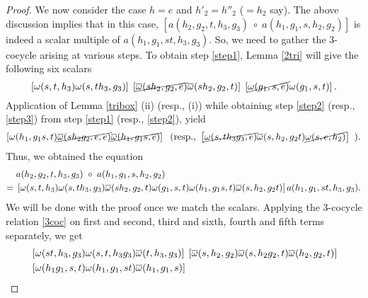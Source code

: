 \begin{proof}
We now consider the case $ h=e $ and $ h'_2 = h''_2$ ($ = h_2$ say).
The above discussion implies that in this case, $ \left[a(h_2 , g_2 , t , h_3 , g_3) \; \circ \; a(h_1 , g_1 , s , h_2 , g_2)\right] $ is indeed a scalar multiple of $ a(h_1 , g_1 , st , h_3 , g_3) $.
So, we need to gather the $ 3 $-cocycle arising at various steps.
To obtain step \ref{step1}, Lemma \ref{2tri} will give the following six scalars
\[
\left[ \omega (s,t,h_3) \omega (s,th_3 , g_3)\right]\;
\left[\cancel{\overline{\omega} (sh_2,g_2,e)} \overline{\omega} (sh_2,g_2,t) \right]\;
\left[ \cancel{\omega (g_1 , s ,e)} \omega (g_1 , s ,t) \right].
\]
Application of Lemma \ref{tribox} (ii) (resp., (i)) while obtaining step \ref{step2} (resp., \ref{step3}) from step \ref{step1} (resp., \ref{step2}), yield
\[
\left[ \omega(h_1 , g_1 s, t) \cancel{\overline{\omega} (sh_2 g_2 ,e ,e)} \cancel{\overline{\omega} (h_1, g_1 s ,e)} \right] \;
\text{ (resp., } \left[ \cancel{\omega (s,th_3g_3,e)} \overline{\omega} (s, h_2, g_2 t) \cancel{\omega (s, e, h_2)} \right]
\text{ ).}
\]
Thus, we obtained the equation
\begin{align*}
& \; a(h_2 , g_2 , t , h_3 , g_3) \; \circ \; a(h_1 , g_1 , s , h_2 , g_2)\\
= & \; \left[ \omega (s,t,h_3) \omega (s,th_3 , g_3) \overline{\omega} (sh_2,g_2,t) \omega (g_1 , s ,t) \omega(h_1 , g_1 s, t)  \overline{\omega} (s, h_2, g_2 t)   \right]
a(h_1 , g_1 , st , h_3 , g_3).
\end{align*}
We will be done with the proof once we match the scalars.
Applying the $ 3 $-cocycle relation \ref{3coc} on first and second, third and sixth, fourth and fifth terms separately, we get
\begin{align*}
&\left[ \omega (st,h_3,g_3) \omega (s,t,h_3g_3) \overline{\omega} (t,h_3,g_3) \right] \; 
\left[ \overline{\omega} (s, h_2, g_2) \overline{\omega} (s, h_2 g_2, t) \overline{\omega} (h_2, g_2, t) \right]\\
&\left[ \omega (h_1g_1 , s, t) \omega (h_1 , g_1 , s t) \overline{\omega} (h_1 , g_1 , s)  \right]
\end{align*}
\end{proof}
